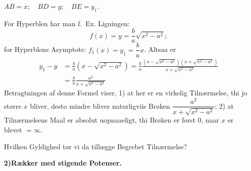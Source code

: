 \documentclass[12pt]{book}
\newcommand{\opage}[1]{\marginnote{\footnotesize\textit{[#1]}}}
\begin{document}
\begin{center}

$AB = x;\quad BD = y;\quad BE = y_1.$
\end{center}

For Hyperblen har man f.\ Ex. Ligningen:
\[
f(x) = y = \frac{b}{a}\sqrt{x^{2} - a^{2}};
\]
for Hyperblens Asymptote:
\opage{26} $f_1(x) = y_1 = \dfrac{b}{a}x$. Altsaa er
\[
\begin{aligned}
y_1 - y &= \frac{b}{a}\left(x - \sqrt{x^{2}-a^{2}}\right)
= \frac{b}{a}
   \frac{\left(x-\sqrt{x^{2}-a^{2}}\right)\left(x+\sqrt{x^{2}-a^{2}}\right)}
        {x+\sqrt{x^{2}-a^{2}}}\\
&= \frac{b}{a}\frac{a^{2}}{x+\sqrt{x^{2}-a^{2}}}
\end{aligned}
\]
Betragtningen af denne Formel viser, 1) at her er en virkelig Tilnærmelse, thi
jo større $x$ bliver, desto mindre bliver naturligviis Brøken
$\dfrac{a^{2}}{x+\sqrt{x^{2}-a^{2}}}$; 2) at Tilnærmelsens Maal er absolut
uopnaaeligt, thi Brøken er først $0$, naar $x$ er blevet $= \infty$.

Hvilken Gyldighed tør vi da tillægge Begrebet Tilnærmelse?

\begin{center}
  {\bfseries 2)\quad Rækker med stigende Potenser.}
\end{center}
{}
\end{document}
